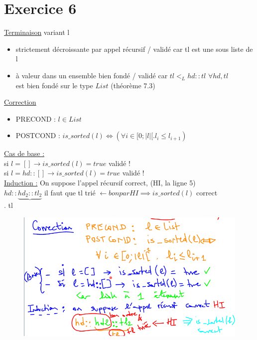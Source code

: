\documentclass[a4paper]{article}
\begin{document}
\section*{Exercice 6}
\underline{Terminaison} variant l\\
\begin{itemize}
  \item strictement décroissante par appel récursif / validé car tl est une sous liste de l\\
  \item à valeur dans un ensemble bien fondé / validé car $tl <_{L}hd::tl$ $\forall hd, tl$\\
    est bien fondé sur le type $List$ (théorème 7.3)\\
\end{itemize}
\underline{Correction}
\begin{itemize}
  \item PRECOND : $l\in List$
  \item POSTCOND : $is\_{sorted}(l) \iff (\forall i\in [0;|l|[.l_{i}\leq l_{i+1}) $\\
\end{itemize}
\underline{Cas de base :}\\
si $l=[  ] \rightarrow is\_sorted(l)=true$ validé !\\
si $l=hd::[] \rightarrow is\_{sorted}(l)=true $ validé !\\
\underline{Induction :} On suppose l'appel récursif correct, (HI, la ligne 5)\\
$hd::\underbrace{hd_{2}::tl_{2}}$ il faut que tl trié $\leftarrow bon par HI \implies is\_{sorted(l)}$ correct\\
.\hspace{10mm} tl
\begin{figure}[!h]
  \centering
  \includegraphics[scale=0.5]{td5_ex6}
\end{figure}
\end{document}
